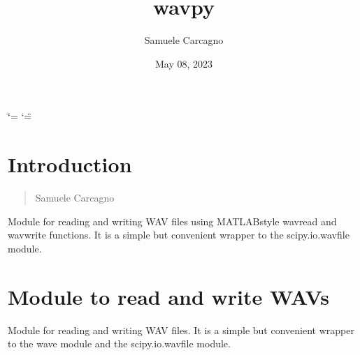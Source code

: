 \documentclass[letterpaper,10pt,english]{sphinxmanual}
\title{wavpy}
\date{May 08, 2023}
\author{Samuele Carcagno}
\begin{document}
\ifdefined\shorthandoff
  \ifnum\catcode`\=\string=\active\shorthandoff{=}\fi
  \ifnum\catcode`\"=\active{}\fi
\fi

\pagestyle{empty}
\sphinxmaketitle
\pagestyle{plain}
\sphinxtableofcontents
\pagestyle{normal}
\label{\detokenize{index::doc}}


\sphinxstepscope


\chapter{Introduction}
\label{\detokenize{intro:introduction}}\label{\detokenize{intro::doc}}\begin{quote}\begin{description}
\sphinxAtStartPar
Samuele Carcagno

\end{description}\end{quote}

\sphinxAtStartPar
Module for reading and writing WAV files using MATLAB\sphinxhyphen{}style wavread and wavwrite functions. It is a simple but convenient wrapper to the scipy.io.wavfile module.


\chapter{ \textendash{} Module to read and write WAVs}
\label{\detokenize{intro:module-wavpy}}\label{\detokenize{intro:wavpy-module-to-read-and-write-wavs}}\label{\detokenize{intro:module-label}}
\sphinxAtStartPar
Module for reading and writing WAV files. It is a simple but convenient wrapper to the wave module and the scipy.io.wavfile module.
\end{document}
